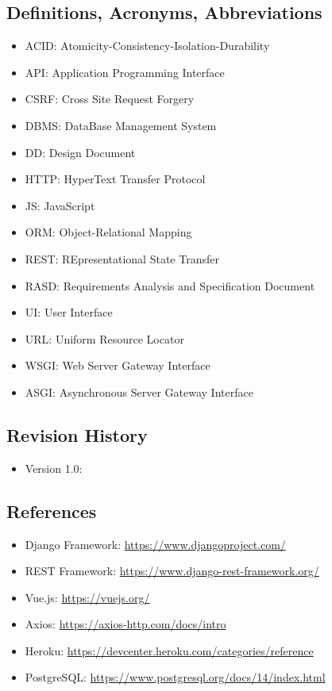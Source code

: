 \documentclass[table, 12pt]{article}
\begin{document}
\subsection{Definitions, Acronyms, Abbreviations}
\begin{itemize}
    \item ACID: Atomicity-Consistency-Isolation-Durability
    \item API: Application Programming Interface
    \item CSRF: Cross Site Request Forgery
    \item DBMS: DataBase Management System
    \item DD: Design Document
    \item HTTP: HyperText Transfer Protocol
    \item JS: JavaScript
    \item ORM: Object-Relational Mapping
    \item REST: REpresentational State Transfer
    \item RASD: Requirements Analysis and Specification Document
    \item UI: User Interface
    \item URL: Uniform Resource Locator
    \item WSGI: Web Server Gateway Interface
    \item ASGI: Asynchronous Server Gateway Interface
\end{itemize}
\subsection{Revision History}
\begin{itemize}
    \item Version 1.0:
\end{itemize}
\subsection{References}
\begin{itemize}
    \item Django Framework: \url{https://www.djangoproject.com/}
    \item REST Framework: \url{https://www.django-rest-framework.org/}
    \item Vue.js: \url{https://vuejs.org/}
    \item Axios: \url{https://axios-http.com/docs/intro}
    \item Heroku: \url{https://devcenter.heroku.com/categories/reference}
    \item PostgreSQL: \url{https://www.postgresql.org/docs/14/index.html}
\end{itemize}
\end{document}
